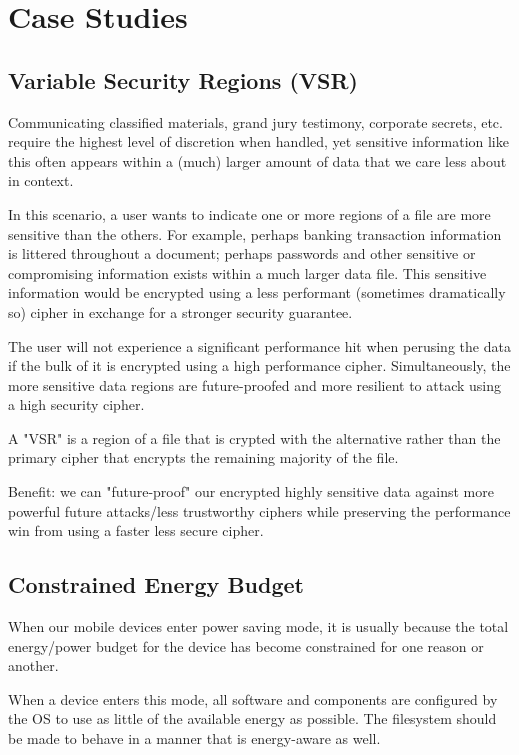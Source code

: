 \section{\SYSTEM{} Case Studies} \label{sec:usecases}

\subsection{Variable Security Regions (VSR)}

Communicating classified materials, grand jury testimony, corporate secrets,
etc. require the highest level of discretion when handled, yet sensitive
information like this often appears within a (much) larger amount of data that
we care less about in context.

In this scenario, a user wants to indicate one or more regions of a file are
more sensitive than the others. For example, perhaps banking transaction
information is littered throughout a document; perhaps passwords and other
sensitive or compromising information exists within a much larger data file.
This sensitive information would be encrypted using a less performant (sometimes
dramatically so) cipher in exchange for a stronger security guarantee.

The user will not experience a significant performance hit when perusing the
data if the bulk of it is encrypted using a high performance cipher.
Simultaneously, the more sensitive data regions are future-proofed and more
resilient to attack using a high security cipher.

A "VSR" is a region of a file that is crypted with the alternative
rather than the primary cipher that encrypts the remaining majority of the file.

Benefit: we can "future-proof" our encrypted highly sensitive data against more
powerful future attacks/less trustworthy ciphers while preserving the
performance win from using a faster less secure cipher.

\subsection{Constrained Energy Budget}

When our mobile devices enter power saving mode, it is usually because the total
energy/power budget for the device has become constrained for one reason or
another.

When a device enters this mode, all software and components are configured by
the OS to use as little of the available energy as possible. The filesystem
should be made to behave in a manner that is energy-aware as well.

